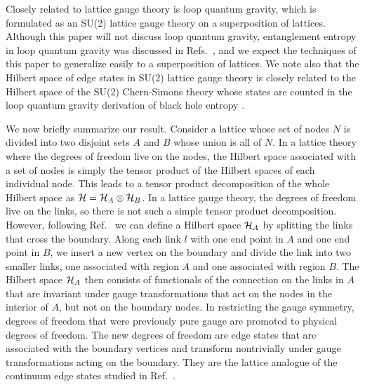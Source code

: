\documentclass[aps,prd,twocolumn,showpacs,groupedaddress,nofootinbib,letterpaper]{revtex4}
\begin{document}
Closely related to lattice gauge theory is loop quantum gravity, which is formulated as an SU(2) lattice gauge theory on a superposition of lattices.
Although this paper will not discuss loop quantum gravity, entanglement entropy in loop quantum gravity was discussed in Refs.~\cite{Dasgupta2005,Donnelly2008}, and we expect the techniques of this paper to generalize easily to a superposition of lattices.
We note also that the Hilbert space of edge states in SU(2) lattice gauge theory is closely related to the Hilbert space of the SU(2) Chern-Simons theory whose states are counted in the loop quantum gravity derivation of black hole entropy \cite{Ashtekar1997,Engle2009}.

We now briefly summarize our result.
Consider a lattice whose set of nodes $N$ is divided into two disjoint sets $A$ and $B$ whose union is all of $N$.
In a lattice theory where the degrees of freedom live on the nodes, the Hilbert space associated with a set of nodes is simply the tensor product of the Hilbert spaces of each individual node. 
This leads to a tensor product decomposition of the whole Hilbert space as ${\cal H} = {\cal H}_A \otimes {\cal H}_B$.
In a lattice gauge theory, the degrees of freedom live on the links, so there is not such a simple tensor product decomposition.
However, following Ref.~\cite{Buividovich2008b} we can define a Hilbert space ${\cal H}_A$ by splitting the links that cross the boundary.
Along each link $l$ with one end point in $A$ and one end point in $B$, we insert a new vertex on the boundary and divide the link into two smaller links, one associated with region $A$ and one associated with region $B$.
The Hilbert space ${\cal H}_A$ then consists of functionals of the connection on the links in $A$ that are invariant under gauge transformations that act on the nodes in the interior of $A$, but not on the boundary nodes.
In restricting the gauge symmetry, degrees of freedom that were previously pure gauge are promoted to physical degrees of freedom.
The new degrees of freedom are edge states that are associated with the boundary vertices and transform nontrivially under gauge transformations acting on the boundary.
They are the lattice analogue of the continuum edge states studied in Ref.~\cite{Balachandran1994}.
\end{document}
